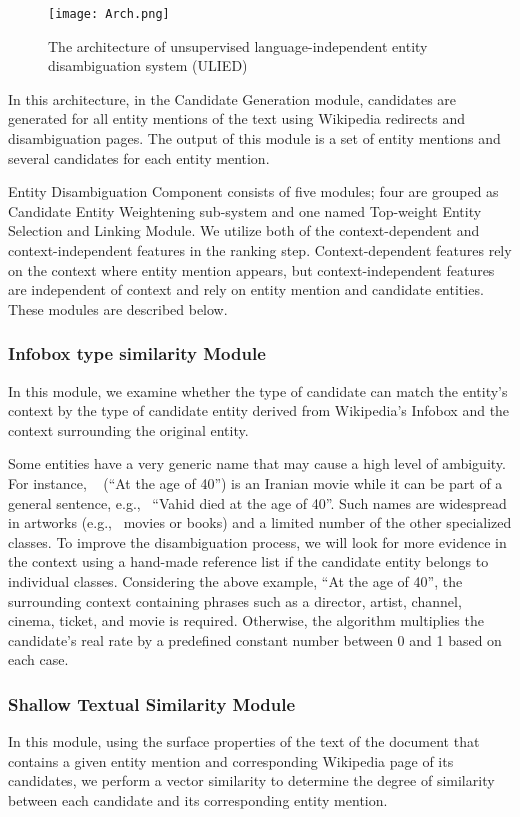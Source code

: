 \documentclass{article}
\newcommand{\persianChehelSalegi}[1]{{\setfarsi\novocalize\<^chl sAlgy>}}
\begin{document}
\begin{figure}[ht]
    \centering
	\texttt{[image: Arch.png]}
	\caption{The architecture of unsupervised language-independent entity disambiguation system (ULIED)}
	\label{fig:Arch}
\end{figure}

In this architecture, in the Candidate Generation module, candidates are generated for all entity mentions of the text using Wikipedia redirects and disambiguation pages. The output of this module is a set of entity mentions and several candidates for each entity mention.

Entity Disambiguation Component consists of five modules; four are grouped as Candidate Entity Weightening sub-system and one named Top-weight Entity Selection and Linking Module. We utilize both of the context-dependent and context-independent features in the ranking step. Context-dependent features rely on the context where entity mention appears, but context-independent features are independent of context and rely on entity mention and candidate entities\cite{shen2014entity}. These modules are described below.

\subsubsection{Infobox type similarity Module}
In this module, we examine whether the type of candidate can match the entity's context by the type of candidate entity derived from Wikipedia's Infobox and the context surrounding the original entity.

Some entities have a very generic name that may cause a high level of ambiguity. For instance, \persianChehelSalegi~ (``At the age of 40'') is an Iranian movie while it can be part of a general sentence, e.g., \  ``Vahid died at the age of 40''. Such names are widespread in artworks (e.g., \ movies or books) and a limited number of the other specialized classes. To improve the disambiguation process, we will look for more evidence in the context using a hand-made reference list if the candidate entity belongs to individual classes. Considering the above example, ``At the age of 40'', the surrounding context containing phrases such as a director, artist, channel, cinema, ticket, and movie is required. Otherwise, the algorithm multiplies the candidate's real rate by a predefined constant number between 0 and 1 based on each case.

\subsubsection{Shallow Textual Similarity Module}
In this module, using the surface properties of the text of the document that contains a given entity mention and corresponding Wikipedia page of its candidates, we perform a vector similarity to determine the degree of similarity between each candidate and its corresponding entity mention.
\end{document}
